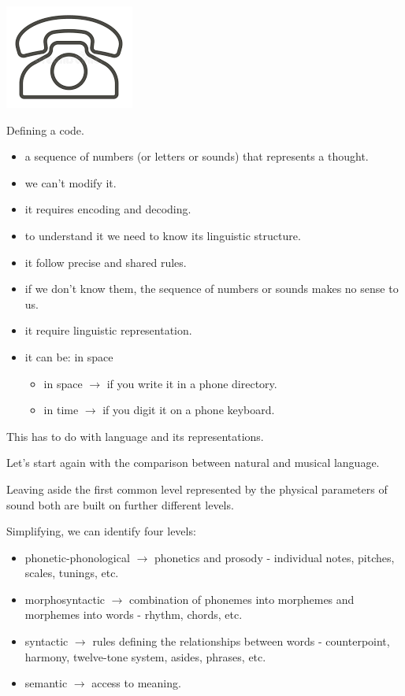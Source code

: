 \begin{center}
\includegraphics[scale=0.4]{../img/telefono.png}
\end{center}

Defining a code.

\begin{itemize}
\tightlist
\item a sequence of numbers (or letters or sounds) that represents a thought.
\item we can't modify it.
\item it requires encoding and decoding.
\item to understand it we need to know its linguistic structure.
\item it follow precise and shared rules.
\item if we don't know them, the sequence of numbers or sounds makes no sense to us.
\item it require linguistic representation.
\item it can be: in space

  \begin{itemize}
  \tightlist
  \item in space \(\rightarrow\) if you write it in a phone directory.
  \item in time \(\rightarrow\) if you digit it on a phone keyboard.
  \end{itemize}
\end{itemize}

This has to do with language and its representations.

Let's start again with the comparison between natural and musical language.

Leaving aside the first common level represented by the physical parameters of sound both are built on further different levels.

Simplifying, we can identify four levels:

\begin{itemize}
\tightlist
\item phonetic-phonological \(\rightarrow\) phonetics and prosody - individual notes, pitches, scales, tunings, etc.
\item morphosyntactic \(\rightarrow\) combination of phonemes into morphemes and morphemes into words - rhythm, chords, etc.
\item syntactic \(\rightarrow\) rules defining the relationships between words - counterpoint, harmony, twelve-tone system, asides, phrases, etc.
\item semantic \(\rightarrow\) access to meaning.
\end{itemize}

